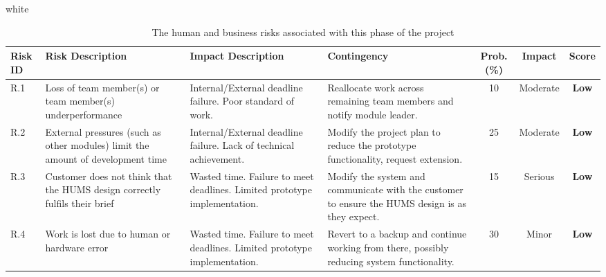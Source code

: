 \documentclass[10pt,a4paper]{article}
\newcommand{\tableformat}[4]{
\begin{table}[H]
\centering
  \rowcolors{2}{gray!10} {white}
\begin{tabular}{#1}
  \hline
  \rowcolor[gray]{0.9} #2
\end{tabular}
\caption{#3}
\label{#4}
\end{table}}
\begin{document}
\tableformat{p{0.8cm} p{3cm} p{3cm} p{3cm} c c c }
{ 	\hline
  	Risk ID & Risk Description & Impact Description & Contingency & Prob.(\%) & Impact & Score \\
  	\hline
  
 	R.1 & Loss of team member(s) or team member(s) underperformance & Internal/External deadline failure. Poor standard of work. & Reallocate work across remaining team members and notify module leader. & 10 & Moderate & \textbf{Low} \\
   	R.2 & External pressures (such as other modules) limit the amount of development time & Internal/External deadline failure. Lack of technical achievement. & Modify the project plan to reduce the prototype functionality, request extension. & 25 & Moderate &  \textbf{Low} \\
   	R.3 & Customer does not think that the HUMS design correctly fulfils their brief & Wasted time. Failure to meet deadlines. Limited prototype implementation. & Modify the system and communicate with the customer to ensure the HUMS design is as they expect. & 15 & Serious &  \textbf{Low} \\
	R.4 & Work is lost due to human or hardware error & Wasted time. Failure to meet deadlines. Limited prototype implementation. & Revert to a backup and continue working from there, possibly reducing system functionality. & 30 & Minor &  \textbf{Low} \\
  	\hline
}
{The human and business risks associated with this phase of the project}{tab:human_risks}
\end{document}
